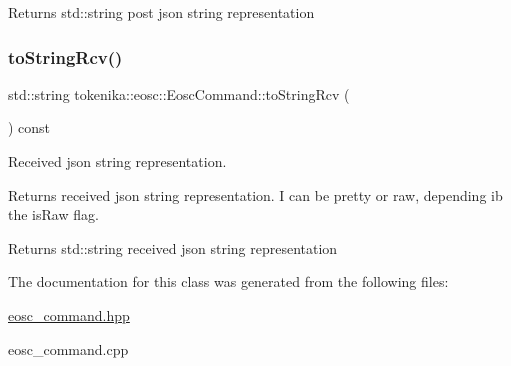 \begin{DoxyReturn}{Returns}
std\+::string post json string representation 
\end{DoxyReturn}
\mbox{\label{classtokenika_1_1eosc_1_1_eosc_command_ad01ef46444d9d8bc708b5d18605c3903}} 
\subsubsection{\texorpdfstring{to\+String\+Rcv()}{toStringRcv()}}
{\footnotesize\ttfamily std\+::string tokenika\+::eosc\+::\+Eosc\+Command\+::to\+String\+Rcv (\begin{DoxyParamCaption}{ }\end{DoxyParamCaption}) const}



Received json string representation. 

Returns received json string representation. I can be pretty or raw, depending ib the {\ttfamily is\+Raw} flag.

\begin{DoxyReturn}{Returns}
std\+::string received json string representation 
\end{DoxyReturn}


The documentation for this class was generated from the following files\+:\begin{DoxyCompactItemize}
\item 
\hyperlink{eosc__command_8hpp}{eosc\+\_\+command.\+hpp}\item 
eosc\+\_\+command.\+cpp\end{DoxyCompactItemize}
